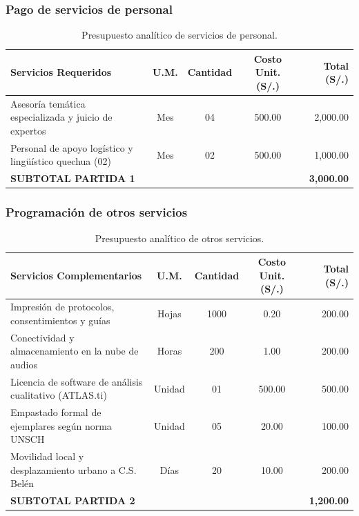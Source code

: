 \subsubsection{Pago de servicios de personal}
\label{sec:5.2.1_personal}
\begin{table}[H]
\centering
\small
\begin{tabularx}{\textwidth}{Xcccr}
\toprule
\textbf{Servicios Requeridos} & \textbf{U.M.} & \textbf{Cantidad} & \textbf{Costo Unit. (S/.)} & \textbf{Total (S/.)} \\
\midrule
Asesoría temática especializada y juicio de expertos & Mes & 04 & 500.00 & 2,000.00 \\
Personal de apoyo logístico y lingüístico quechua (02) & Mes & 02 & 500.00 & 1,000.00 \\
\midrule
\textbf{SUBTOTAL PARTIDA 1} & & & & \textbf{3,000.00} \\
\bottomrule
\end{tabularx}
\caption{Presupuesto analítico de servicios de personal.}
\label{tab:presupuesto_personal}
\end{table}

\subsubsection{Programación de otros servicios}
\label{sec:5.2.2_otros_servicios}
\begin{table}[H]
\centering
\small
\begin{tabularx}{\textwidth}{Xcccr}
\toprule
\textbf{Servicios Complementarios} & \textbf{U.M.} & \textbf{Cantidad} & \textbf{Costo Unit. (S/.)} & \textbf{Total (S/.)} \\
\midrule
Impresión de protocolos, consentimientos y guías & Hojas & 1000 & 0.20 & 200.00 \\
Conectividad y almacenamiento en la nube de audios & Horas & 200 & 1.00 & 200.00 \\
Licencia de software de análisis cualitativo (ATLAS.ti) & Unidad & 01 & 500.00 & 500.00 \\
Empastado formal de ejemplares según norma UNSCH & Unidad & 05 & 20.00 & 100.00 \\
Movilidad local y desplazamiento urbano a C.S. Belén & Días & 20 & 10.00 & 200.00 \\
\midrule
\textbf{SUBTOTAL PARTIDA 2} & & & & \textbf{1,200.00} \\
\bottomrule
\end{tabularx}
\caption{Presupuesto analítico de otros servicios.}
\label{tab:presupuesto_servicios}
\end{table}

